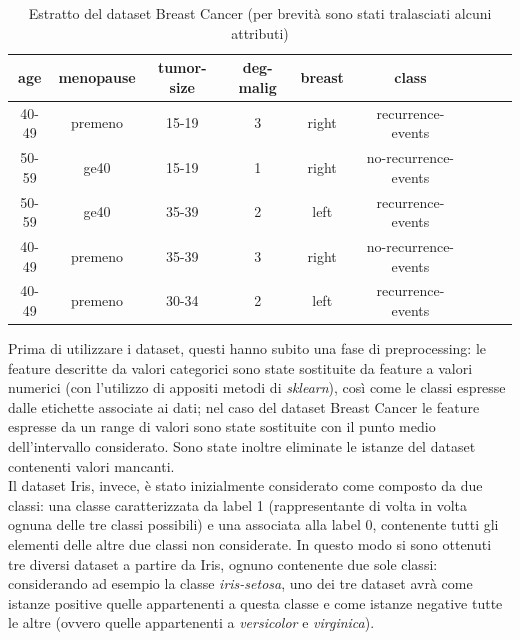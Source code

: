 \documentclass[oneside, openany]{book}
\begin{document}
	\begin{table}[h]
		\caption{Estratto del dataset Breast Cancer (per brevità sono stati tralasciati alcuni attributi)}
		\begin{center}
			\begin{tabular}{|c|c|c|c|c|c|c|c|c|}
				\hline
					age &  menopause &  tumor-size &  deg-malig &  breast &  class\\
				\hline
					40-49 &   premeno &      15-19 &          3 &  right &     recurrence-events\\ 
					50-59 &      ge40 &      15-19 &          1 &  right &     no-recurrence-events\\ 
					50-59 &      ge40 &      35-39 &          2 &   left &     recurrence-events\\ 
					40-49 &   premeno &      35-39 &          3 &  right &     no-recurrence-events\\
					40-49 &   premeno &      30-34 &          2 &   left &     recurrence-events\\
				\hline	
			\end{tabular}
		\end{center}
		\label{tab:breast}
	\end{table}
	
	Prima di utilizzare i dataset, questi hanno subito una fase di preprocessing: le feature descritte da valori categorici sono state sostituite da feature a valori numerici (con l'utilizzo di appositi metodi di \textit{sklearn}), così come le classi espresse dalle etichette associate ai dati; nel caso del dataset Breast Cancer le feature espresse da un range di valori sono state sostituite con il punto medio dell'intervallo considerato. Sono state inoltre eliminate le istanze del dataset contenenti valori mancanti.\\
	Il dataset Iris, invece, è stato inizialmente considerato come composto da due classi: una classe caratterizzata da label 1 (rappresentante di volta in volta ognuna delle tre classi possibili) e una associata alla label 0, contenente tutti gli elementi delle altre due classi non considerate. In questo modo si sono ottenuti tre diversi dataset a partire da Iris, ognuno contenente due sole classi: considerando ad esempio la classe \textit{iris-setosa}, uno dei tre dataset avrà come istanze positive quelle appartenenti a questa classe e come istanze negative tutte le altre (ovvero quelle appartenenti a \textit{versicolor} e \textit{virginica}).  
	
\end{document}
